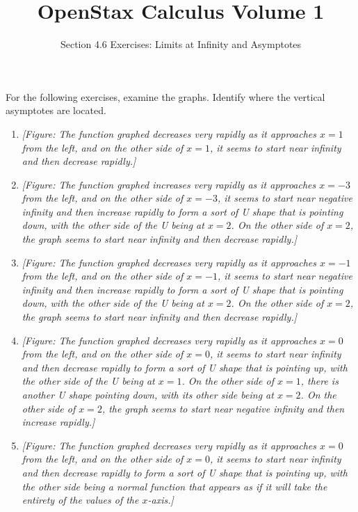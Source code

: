 \documentclass{exercises}
\title{OpenStax Calculus Volume 1}
\subtitle{Section 4.6 Exercises: Limits at Infinity and Asymptotes}
\author{}
\date{}
\begin{document}
\maketitle


For the following exercises, examine the graphs. Identify where the vertical asymptotes are located.

\begin{enumerate}[start=1]
\item \textit{[Figure: The function graphed decreases very rapidly as it approaches $x = 1$ from the left, and on the other side of $x = 1$, it seems to start near infinity and then decrease rapidly.]}
\item \textit{[Figure: The function graphed increases very rapidly as it approaches $x = -3$ from the left, and on the other side of $x = -3$, it seems to start near negative infinity and then increase rapidly to form a sort of U shape that is pointing down, with the other side of the U being at $x = 2$. On the other side of $x = 2$, the graph seems to start near infinity and then decrease rapidly.]}
\item \textit{[Figure: The function graphed decreases very rapidly as it approaches $x = -1$ from the left, and on the other side of $x = -1$, it seems to start near negative infinity and then increase rapidly to form a sort of U shape that is pointing down, with the other side of the U being at $x = 2$. On the other side of $x = 2$, the graph seems to start near infinity and then decrease rapidly.]}
\item \textit{[Figure: The function graphed decreases very rapidly as it approaches $x = 0$ from the left, and on the other side of $x = 0$, it seems to start near infinity and then decrease rapidly to form a sort of U shape that is pointing up, with the other side of the U being at $x = 1$. On the other side of $x = 1$, there is another U shape pointing down, with its other side being at $x = 2$. On the other side of $x = 2$, the graph seems to start near negative infinity and then increase rapidly.]}
\item \textit{[Figure: The function graphed decreases very rapidly as it approaches $x = 0$ from the left, and on the other side of $x = 0$, it seems to start near infinity and then decrease rapidly to form a sort of U shape that is pointing up, with the other side being a normal function that appears as if it will take the entirety of the values of the $x$-axis.]}
\end{enumerate}
\end{document}
